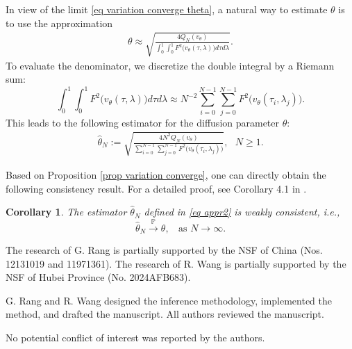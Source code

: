 \documentclass[11pt,reqno]{amsart}
\numberwithin{equation}{section}
\newtheorem{corollary}[theorem]{Corollary}
\newcommand{\1}{{\bf 1}}
\newcommand{\2}{{\bf 2}}
\begin{document}
In view of  the limit   \eqref{eq variation converge theta},  a natural way to estimate   $\theta$ is to use  the  approximation 
    \begin{align}\label{eq appr1}
   \theta  \approx \sqrt{\frac{ 4 Q_{N}(v_{\theta}) }{  \int_0^1\int_0^1   F^2\big(v_{\theta}(\tau, \lambda) \big) d\tau d\lambda}}.
    \end{align}
    To evaluate the  denominator,   we discretize the  double integral by  a   Riemann  sum:
    $$
    \int_0^1\int_0^1   F^2\big(v_{\theta}(\tau, \lambda) \big) d\tau d\lambda\approx N^{-2}  \sum_{i=0}^{N-1} \sum_{j=0}^{N-1}  F^2\big(v_{\theta}(\tau_i, \lambda_j) \big).
    $$
    This leads to the following estimator for   the diffusion parameter $\theta$:  
      \begin{align}\label{eq appr2}
    \hat \theta_N := \sqrt{\frac{4 N^2 Q_{N}(v_{\theta})}{   \sum_{i=0}^{N-1} \sum_{j=0}^{N-1}   F^2\big(v_{\theta}(\tau_i, \lambda_j) \big)}}, \ \ \ N\ge1.
    \end{align}
    
    
Based on Proposition \ref{prop variation converge}, one can directly obtain the following consistency result. For a detailed proof, see Corollary 4.1 in \cite{LW25}.  
  \begin{corollary}\label{coro est}   
 The estimator $  \hat \theta_N$ defined in  \eqref{eq appr2} is weakly consistent, i.e., 
$$ 
\hat \theta_N \stackrel{\mathbb P}{\longrightarrow}   \theta,  \ \ \ \ \text{as } N\rightarrow\infty.
 $$
\end{corollary}
                     
                     
                   
 
 \vskip0.3cm 
 
  The research of G. Rang is partially supported by the NSF of  China (Nos. 12131019 and 11971361). The research of R. Wang is partially supported by the NSF of Hubei Province (No. 2024AFB683).
 
 
 \vskip0.3cm 
 
   G. Rang  and R. Wang designed the inference methodology, implemented the method, and drafted  the manuscript. All authors reviewed the manuscript.
\vskip0.3cm


\vskip0.3cm
  No potential conflict of interest was reported by the authors.
\end{document}
